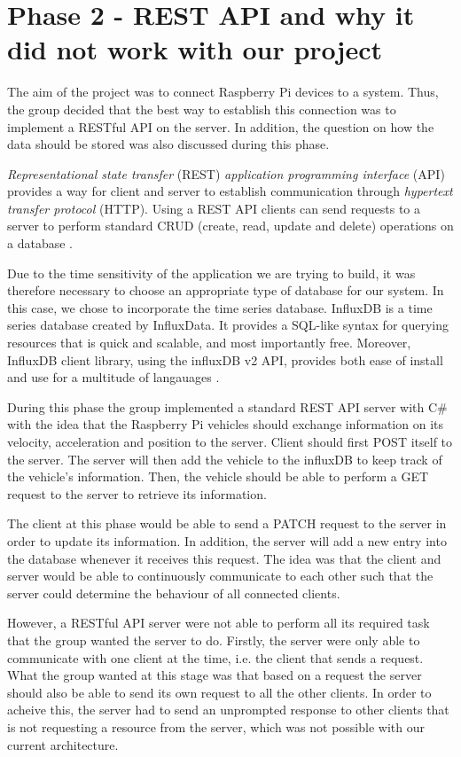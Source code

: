 \section{Phase 2 - REST API and why it did not work with our project}\label{phase2}
The aim of the project was to connect Raspberry Pi devices to a system. Thus, the group decided that the best way to establish this connection was to implement a RESTful API on the server. In addition, the question on how the data should be stored was also discussed during this phase.

\emph{Representational state transfer} (REST) \emph{application programming interface} (API) provides a way for client and server to establish communication through \emph{hypertext transfer protocol} (HTTP). Using a REST API clients can send requests to a server to perform standard CRUD (create, read, update and delete) operations on a database \parencite{rest_api}.

Due to the time sensitivity of the application we are trying to build, it was therefore necessary to choose an appropriate type of database for our system. In this case, we chose to incorporate the time series database. InfluxDB is a time series database created by InfluxData. It provides a SQL-like syntax for querying resources that is quick and scalable, and most importantly free. Moreover, InfluxDB client library, using the influxDB v2 API, provides both ease of install and use for a multitude of langauages \parencite{influxdb}.

During this phase the group implemented a standard REST API server with C\# with the idea that the Raspberry Pi vehicles should exchange information on its velocity, acceleration and position to the server. Client should first POST itself to the server. The server will then add the vehicle to the influxDB to keep track of the vehicle's information. Then, the vehicle should be able to perform a GET request to the server to retrieve its information.

The client at this phase would be able to send a PATCH request to the server in order to update its information. In addition, the server will add a new entry into the database whenever it receives this request. The idea was that the client and server would be able to continuously communicate to each other such that the server could determine the behaviour of all connected clients.

However, a RESTful API server were not able to perform all its required task that the group wanted the server to do. Firstly, the server were only able to communicate with one client at the time, i.e. the client that sends a request. What the group wanted at this stage was that based on a request the server should also be able to send its own request to all the other clients. In order to acheive this, the server had to send an unprompted response to other clients that is not requesting a resource from the server, which was not possible with our current architecture.

